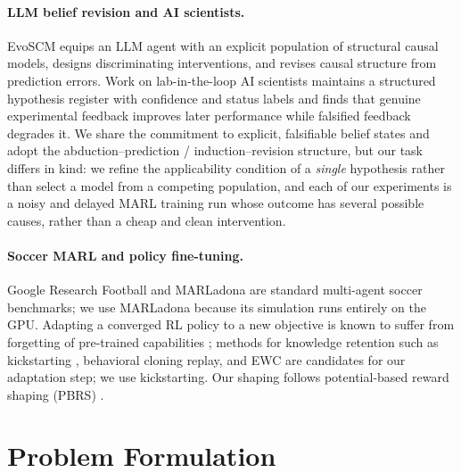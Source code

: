 \documentclass[11pt]{article}
\begin{document}
\paragraph{LLM belief revision and AI scientists.}
EvoSCM \citep{evoscm2026} equips an LLM agent with an explicit population of structural causal models, designs discriminating interventions, and revises causal structure from prediction errors.
Work on lab-in-the-loop AI scientists \citep{labloop2026} maintains a structured hypothesis register with confidence and status labels and finds that genuine experimental feedback improves later performance while falsified feedback degrades it.
We share the commitment to explicit, falsifiable belief states and adopt the abduction--prediction / induction--revision structure, but our task differs in kind: we refine the applicability condition of a \emph{single} hypothesis rather than select a model from a competing population, and each of our experiments is a noisy and delayed MARL training run whose outcome has several possible causes, rather than a cheap and clean intervention.

\paragraph{Soccer MARL and policy fine-tuning.}
Google Research Football \citep{kurach2020grf} and MARLadona \citep{li2025marladona} are standard multi-agent soccer benchmarks; we use MARLadona because its simulation runs entirely on the GPU.
Adapting a converged RL policy to a new objective is known to suffer from forgetting of pre-trained capabilities \citep{wolczyk2024finetuning}; methods for knowledge retention such as kickstarting \citep{schmitt2018kickstarting}, behavioral cloning replay, and EWC \citep{kirkpatrick2017ewc} are candidates for our adaptation step; we use kickstarting.
Our shaping follows potential-based reward shaping (PBRS) \citep{ng1999policy}.

\section{Problem Formulation}
\label{sec:problem}
\end{document}
